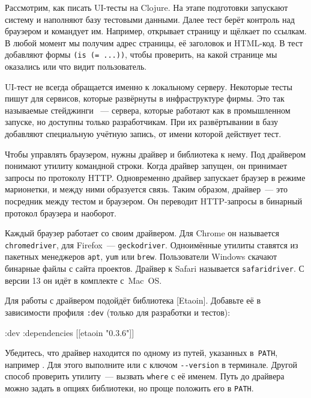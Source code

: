 Рассмотрим, как писать UI-тесты на Clojure. На этапе подготовки запускают
систему и наполняют базу тестовыми данными. Далее тест берёт контроль над
браузером и командует им. Например, открывает страницу 
и щёлкает по ссылкам. В любой момент мы получим адрес страницы, её заголовок
и HTML-код. В тест добавляют формы \verb|(is (= ...))|, чтобы проверить,
на какой странице мы оказались или что видит пользователь.

UI-тест не всегда обращается именно к локальному серверу. Некоторые тесты пишут
для сервисов, которые развёрнуты в инфраструктуре фирмы. Это так называемые
стейджинги ~--- сервера, которые работают как в промышленном
запуске, но доступны только разработчикам. При их развёртывании в базу добавляют
специальную учётную запись, от имени которой действует тест.

Чтобы управлять браузером, нужны драйвер и библиотека к нему. Под драйвером
понимают утилиту командной строки. Когда драйвер запущен, он принимает запросы
по протоколу HTTP. Одновременно драйвер запускает браузер в режиме марионетки, и
между ними образуется связь. Таким образом, драйвер~--- это посредник между
тестом и браузером. Он переводит HTTP-запросы в бинарный протокол браузера и
наоборот.


Каждый браузер работает со своим драйвером. Для Chrome он называется
\verb|chromedriver|, для Firefox~--- \verb|geckodriver|. Одноимённые утилиты
ставятся из пакетных менеджеров \verb|apt|, \verb|yum| или
\verb|brew|. Пользователи Windows скачают бинарные файлы с сайта
проектов. Драйвер к Safari называется \verb|safaridriver|. С версии 13 он
идёт в комплекте с~Mac~OS.


Для работы с драйвером подойдёт библиотека
[Etaoin].
Добавьте её в зависимости профиля \verb|:dev| (только для разработки и тестов):

\begin{english}
  \begin{clojure}
:dev {:dependencies [[etaoin "0.3.6"]]}
  \end{clojure}
\end{english}

Убедитесь, что драйвер находится по одному из путей, указанных в~\verb|PATH|,
например . Для этого выполните  или
 с ключом \verb|--version| в терминале. Другой способ
проверить утилиту~--- вызвать \verb|where| с её именем. Путь до драйвера можно
задать в опциях библиотеки, но проще положить его в \verb|PATH|.

